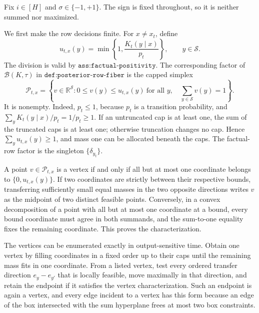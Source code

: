 Fix \(i\in[H]\) and \(\sigma\in\{-1,+1\}\).  The sign is fixed throughout, so it is neither summed nor maximized.

We first make the row decisions finite.  For \(x\ne x_t\), define
\[
 u_{t,x}(y)=\min\!\left\{1,\frac{K_t(y\mid x)}{p_t}\right\},
 \qquad y\in\mathcal S.
\]
The division is valid by \(\texttt{ass:factual-positivity}\).  The corresponding factor of \(\mathcal B(K,\tau)\) in \(\texttt{def:posterior-row-fiber}\) is the capped simplex
\[
 \mathcal P_{t,x}=\left\{v\in\mathbb R^{\mathcal S}:
 0\le v(y)\le u_{t,x}(y)\ \text{for all }y,\quad
 \sum_{y\in\mathcal S}v(y)=1\right\}.
 \tag{1}
\]
It is nonempty.  Indeed, \(p_t\le1\), because \(p_t\) is a transition probability, and
\(\sum_y K_t(y\mid x)/p_t=1/p_t\ge1\).  If an untruncated cap is at least one, the sum of the truncated caps is at least one; otherwise truncation changes no cap.  Hence \(\sum_yu_{t,x}(y)\ge1\), and mass one can be allocated beneath the caps.  The factual-row factor is the singleton \(\{\delta_{y_t}\}\).

A point \(v\in\mathcal P_{t,x}\) is a vertex if and only if all but at most one coordinate belongs to \(\{0,u_{t,x}(y)\}\).  If two coordinates are strictly between their respective bounds, transferring sufficiently small equal masses in the two opposite directions writes \(v\) as the midpoint of two distinct feasible points.  Conversely, in a convex decomposition of a point with all but at most one coordinate at a bound, every bound coordinate must agree in both summands, and the sum-to-one equality fixes the remaining coordinate.  This proves the characterization.

The vertices can be enumerated exactly in output-sensitive time.  Obtain one vertex by filling coordinates in a fixed order up to their caps until the remaining mass fits in one coordinate.  From a listed vertex, test every ordered transfer direction \(e_y-e_{y'}\) that is locally feasible, move maximally in that direction, and retain the endpoint if it satisfies the vertex characterization.  Such an endpoint is again a vertex, and every edge incident to a vertex has this form because an edge of the box intersected with the sum hyperplane frees at most two box constraints.

